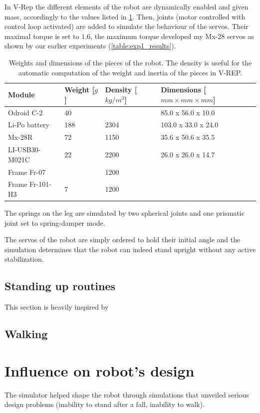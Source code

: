 In V-Rep the different elements of the robot are dynamically enabled and given mass, accordingly to the values listed in \cref{table:weights}. Then, joints (motor controlled with control loop activated) are added to simulate the behaviour of the servos. Their maximal torque is set to $1.6$, the maximum torque developed my Mx-28 servos as shown by our earlier experiments (\cref{table:exp1_results}). 

\begin{table}[htp]
\center
\begin{tabularx}{\textwidth}{@{} l X X l @{}}
\toprule
\textbf{Module} & \textbf{Weight [$g$]} &  \textbf{Density [$kg/m^3$]}& \textbf{Dimensions [$mm \times mm \times mm$]}\\ 
\midrule
Odroid C-2 & 40 &  & 85.0 x 56.0 x 10.0\\
Li-Po battery & 188 & 2304 & 103.0 x 33.0 x 24.0\\
Mx-28R & 72 & 1150 & 35.6 x 50.6 x 35.5\\
LI-USB30-M021C & 22 & 2200 & 26.0 x 26.0 x 14.7\\
Frame Fr-07 & & 1200 & \\
Frame Fr-101-H3 & 7 & 1200 & \\
\bottomrule
\end{tabularx}
\caption[Weights and dimensions of the pieces of the robot]{Weights and dimensions of the pieces of the robot. The density is useful for the automatic computation of the weight and inertia of the pieces in V-REP.}
\label{table:weights}
\end{table}

The springs on the leg are simulated by two spherical joints and one prismatic joint set to spring-damper mode.

The servos of the robot are simply ordered to hold their initial angle and the simulation determines that the robot can indeed stand upright without any active stabilization.

\subsection{Standing up routines}
This section is heavily inspired by \cite{Stuckler06}

\subsection{Walking}

\section{Influence on robot's design}
The simulator helped shape the robot through simulations that unveiled serious design problems (inability to stand after a fall, inability to walk).

